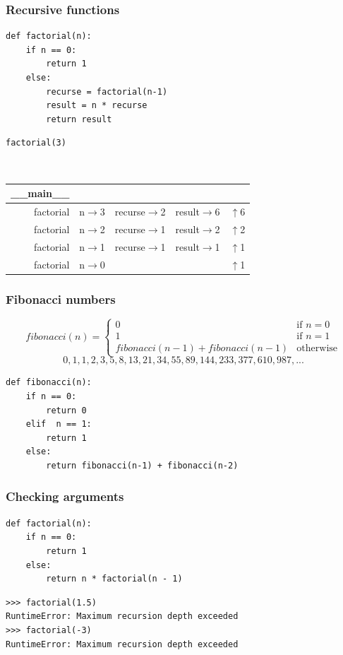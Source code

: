 \documentclass{beamer}
\newcommand{\arrow}{\ensuremath{\rightarrow}}
\newcommand{\uparr}{\ensuremath{\uparrow}}
\newcommand{\bfr}[1]{\begin{frame}[fragile]\frametitle{{ #1 }}}
\begin{document}
\bfr{Recursive functions}
\begin{lstlisting}
def factorial(n):
    if n == 0:
        return 1
    else:
        recurse = factorial(n-1)
        result = n * recurse
        return result
\end{lstlisting}
\begin{lstlisting}
factorial(3)
\end{lstlisting}
{\tt
\begin{tabular}{|rccc||l|}\hline
\_\_main\_\_ &&&&\\\hline
factorial & n\arrow 3 & recurse\arrow 2 & result\arrow 6 & \uparr 6 \\\hline\hline
factorial &  n\arrow 2 & recurse\arrow 1 & result\arrow 2 & \uparr  2\\\hline\hline
factorial &  n\arrow 1 & recurse\arrow 1 & result\arrow 1 & \uparr 1 \\\hline\hline
factorial &  n\arrow 0 &  &  & \uparr 1\\\hline
\end{tabular}
}
\end{frame}

\bfr{Fibonacci numbers}
\[
\mathit{fibonacci}(n) = \left\{
  \begin{array}{ll}
    0 & \mbox{if $n = 0$}\\
    1 & \mbox{if $n = 1$}\\
    \mathit{fibonacci}(n-1) + \mathit{fibonacci}(n-1) & \mbox{otherwise}
    \end{array}\right.
\]
\[0, 1, 1, 2, 3, 5, 8, 13, 21, 34, 55, 89, 144, 233, 377, 610, 987, ...
\]
\begin{lstlisting}
def fibonacci(n):
    if n == 0:
        return 0
    elif  n == 1:
        return 1
    else:
        return fibonacci(n-1) + fibonacci(n-2)
\end{lstlisting}
\end{frame}

\bfr{Checking arguments}
\begin{lstlisting}
def factorial(n):
    if n == 0:
        return 1
    else:
        return n * factorial(n - 1)
\end{lstlisting}
\begin{lstlisting}
>>> factorial(1.5)
RuntimeError: Maximum recursion depth exceeded
>>> factorial(-3)
RuntimeError: Maximum recursion depth exceeded
\end{lstlisting}


\end{frame}
\end{document}
